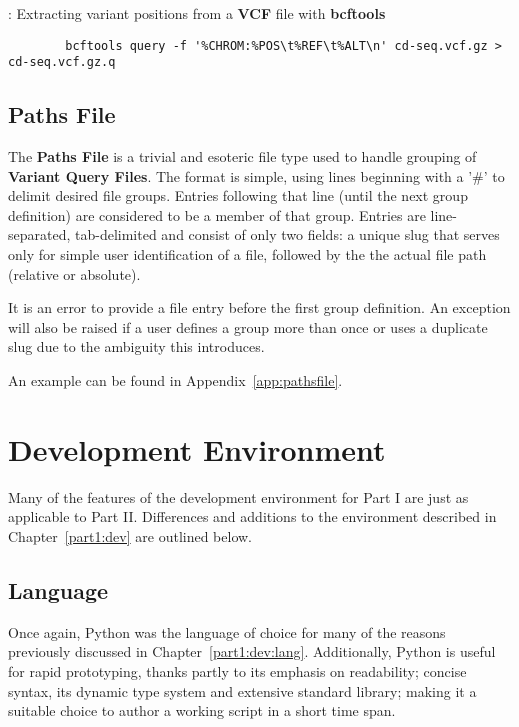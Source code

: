 \begin{listing}[H]
    \caption[bquery]{: Extracting variant positions from a \textbf{VCF} file
    with \textbf{bcftools}}
    \label{list:bquery}
    \begin{verbatim}
        bcftools query -f '%CHROM:%POS\t%REF\t%ALT\n' cd-seq.vcf.gz > cd-seq.vcf.gz.q
    \end{verbatim}
\end{listing}



\subsection{Paths File}
\label{sec:pathsfile}

The \textbf{Paths File} is a trivial and esoteric file type used to handle
grouping of \textbf{Variant Query Files}. The format is simple, using lines
beginning with a '\#' to delimit desired file groups. Entries following that
line (until the next group definition) are considered to be a member of that
group. Entries are line-separated, tab-delimited and consist of only two fields:
a unique slug that serves only for simple user identification of a file,
followed by the the actual file path (relative or absolute).

It is an error to provide a file entry before the first group definition. An
exception will also be raised if a user defines a group more than once or uses a
duplicate slug due to the ambiguity this introduces.

An example can be found in Appendix~\ref{app:pathsfile}.


\section{Development Environment}

Many of the features of the development environment for Part I are just as
applicable to Part II. Differences and additions to the environment described in
Chapter~\ref{part1:dev} are outlined below.

\subsection{Language}

Once again, Python was the language of choice for many of the reasons previously
discussed in Chapter~\ref{part1:dev:lang}. Additionally, Python is useful for
rapid prototyping, thanks partly to its emphasis on readability; concise
syntax, its dynamic type system and extensive standard library; making it a
suitable choice to author a working script in a short time span.


